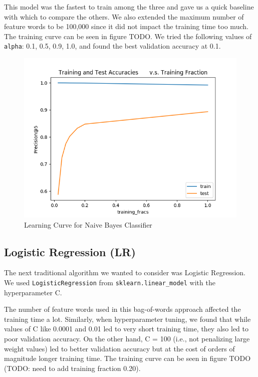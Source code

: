 \documentclass{sig-alternate-05-2015}
\begin{document}
This model was the fastest to train among the three and gave us a quick baseline with which to compare the others. We also extended the maximum number of feature words to be 100,000 since it did not impact the training time too much. The training curve can be seen in figure TODO. We tried the following values of \verb+alpha+: 0.1, 0.5, 0.9, 1.0, and found the best validation accuracy at 0.1.

\begin{figure}[H]
\centering
\includegraphics[width=\linewidth]{plots/learning_curve_nbc.png}
\caption{Learning Curve for Naive Bayes Classifier}
\end{figure}

\subsection{Logistic Regression (LR)}

The next traditional algorithm we wanted to consider was Logistic Regression. We used \verb+LogisticRegression+ from \verb+sklearn.linear_model+ with the hyperparameter C.

The number of feature words used in this bag-of-words approach affected the training time a lot. Similarly, when hyperparameter tuning, we found that while values of C like 0.0001 and 0.01 led to very short training time, they also led to poor validation accuracy. On the other hand, C = 100 (i.e., not penalizing large weight values) led to better validation accuracy but at the cost of orders of magnitude longer training time. The training curve can be seen in figure TODO (TODO: need to add training fraction 0.20).
\end{document}
